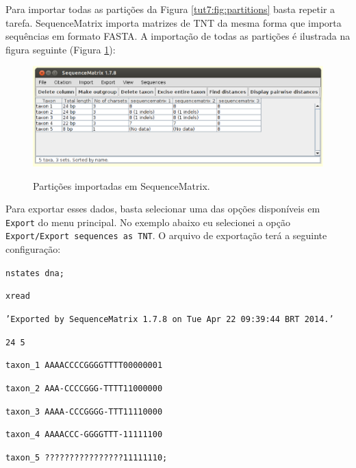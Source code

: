 \begin{refsection}
Para importar todas as partições da Figura \ref{tut7:fig:partitions} basta repetir a tarefa. SequenceMatrix importa matrizes de TNT da mesma forma que importa sequências em formato FASTA. A importação de todas as partições é ilustrada na figura seguinte (Figura \ref{tut7:fig:seqmatrix_4}):

  \begin{figure}[H]
       \centering
      {\includegraphics[scale=0.5]{figures/tut7/seqmatrix_4.eps}}
	{\caption[Partições importadas em SequenceMatrix]{Partições importadas em SequenceMatrix.}\label{tut7:fig:seqmatrix_4}}
  \end{figure}


Para exportar esses dados, basta selecionar uma das opções disponíveis em \texttt{Export} do menu principal. No exemplo abaixo eu selecionei a opção \texttt{Export/Export sequences as TNT}. O arquivo de exportação terá a seguinte configuração:\\

\scriptsize

\noindent\texttt{nstates~dna;}

\noindent\texttt{xread}

\noindent\texttt{'Exported~by~SequenceMatrix~1.7.8~on~Tue~Apr~22~09:39:44~BRT~2014.'}

\noindent\texttt{24~5}

\noindent\texttt{taxon\_1~AAAACCCCGGGGTTTT00000001}

\noindent\texttt{taxon\_2~AAA-CCCCGGG-TTTT11000000}

\noindent\texttt{taxon\_3~AAAA-CCCGGGG-TTT11110000}

\noindent\texttt{taxon\_4~AAAACCC-GGGGTTT-11111100}

\noindent\texttt{taxon\_5~????????????????11111110;}\\


\end{refsection}
